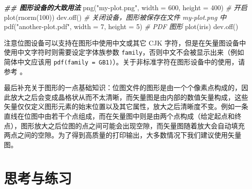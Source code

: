 \documentclass[
  b5paper,
  UTF8,twoside]{book}
\newenvironment{Shaded}{\begin{snugshade}}{\end{snugshade}}
\newcommand{\AttributeTok}[1]{\textcolor[rgb]{0.77,0.63,0.00}{#1}}
\newcommand{\CommentTok}[1]{\textcolor[rgb]{0.56,0.35,0.01}{\textit{#1}}}
\newcommand{\DecValTok}[1]{\textcolor[rgb]{0.00,0.00,0.81}{#1}}
\newcommand{\DocumentationTok}[1]{\textcolor[rgb]{0.56,0.35,0.01}{\textbf{\textit{#1}}}}
\newcommand{\FunctionTok}[1]{\textcolor[rgb]{0.00,0.00,0.00}{#1}}
\newcommand{\NormalTok}[1]{#1}
\newcommand{\StringTok}[1]{\textcolor[rgb]{0.31,0.60,0.02}{#1}}
\begin{document}
\begin{Shaded}
\begin{Highlighting}[]
\DocumentationTok{\#\# 图形设备的大致用法}
\FunctionTok{png}\NormalTok{(}\StringTok{"my{-}plot.png"}\NormalTok{, }\AttributeTok{width =} \DecValTok{600}\NormalTok{, }\AttributeTok{height =} \DecValTok{400}\NormalTok{) }\CommentTok{\# 开启}
\FunctionTok{plot}\NormalTok{(}\FunctionTok{rnorm}\NormalTok{(}\DecValTok{100}\NormalTok{))}
\FunctionTok{dev.off}\NormalTok{() }\CommentTok{\# 关闭设备，图形被保存在文件 my{-}plot.png 中}
\FunctionTok{pdf}\NormalTok{(}\StringTok{"another{-}plot.pdf"}\NormalTok{, }\AttributeTok{width =} \DecValTok{7}\NormalTok{, }\AttributeTok{height =} \DecValTok{5}\NormalTok{) }\CommentTok{\# PDF 图形}
\FunctionTok{plot}\NormalTok{(iris)}
\FunctionTok{dev.off}\NormalTok{()}
\end{Highlighting}
\end{Shaded}

注意位图设备可以支持在图形中使用中文或其它 CJK 字符，但是在矢量图设备中使用中文字符时则需要设定字体族参数 \texttt{family}，否则中文不会被显示出来（例如简体中文应该用 \texttt{pdf(family\ =\ \textquotesingle{}GB1\textquotesingle{})}）。关于非标准字符在图形设备中的使用，请参考 \citet{Murrell06} 。

最后补充关于图形的一点基础知识：位图文件的图形是由一个个像素点构成的，因此放大之后会变成晶格状从而不太清晰，而矢量图是由内部的数值矢量构成，这些矢量仅仅定义图形元素的始末位置以及其它属性，放大之后清晰度不变。例如一条直线在位图中由若干个点组成，而在矢量图中则是由两个点构成（给定起点和终点），图形放大之后位图的点之间可能会出现空隙，而矢量图随着放大会自动填充两点之间的空隙。为了得到高质量的打印输出，大多数情况下我们建议使用矢量图。

\hypertarget{ux601dux8003ux4e0eux7ec3ux4e60-8}{%
\section{思考与练习}\label{ux601dux8003ux4e0eux7ec3ux4e60-8}}
\end{document}

